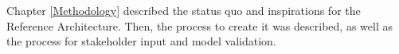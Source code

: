 Chapter \ref{Methodology} described the status quo and inspirations for the Reference Architecture. Then, the process to create it was described, as well as the process for stakeholder input and model validation. 